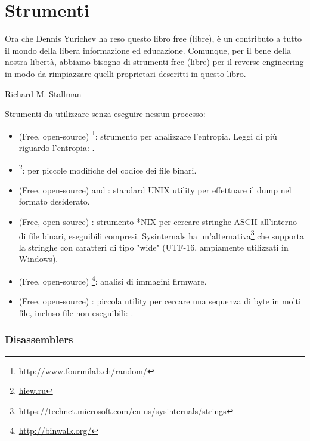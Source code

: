 \chapter{Strumenti}

\epigraph{Ora che Dennis Yurichev ha reso questo libro free (libre), è un
contributo a tutto il mondo della libera informazione ed educazione.
Comunque, per il bene della nostra libertà, abbiamo bisogno di strumenti free (libre) per il reverse
engineering in modo da rimpiazzare quelli proprietari descritti in questo libro.}{Richard M. Stallman}


Strumenti da utilizzare senza eseguire nessun processo:


\begin{itemize}
\item
(Free, open-source) \footnote{\url{http://www.fourmilab.ch/random/}}: strumento per analizzare l'entropia.
Leggi di più riguardo l'entropia: .

\item
\label{Hiew}
\footnote{\href{http://go.yurichev.com/17035}{hiew.ru}}:
per piccole modifiche del codice dei file binari.

\item (Free, open-source)  and : standard UNIX utility per effettuare il dump nel formato desiderato. 

\item (Free, open-source) : strumento *NIX per cercare stringhe ASCII all'interno di file binari, eseguibili compresi.
Sysinternals ha un'alternativa\footnote{\url{https://technet.microsoft.com/en-us/sysinternals/strings}}
che supporta la stringhe con caratteri di tipo "wide" (UTF-16, ampiamente utilizzati in Windows).

\item (Free, open-source) \footnote{\url{http://binwalk.org/}}: analisi di immagini firmware.

\item
{}
(Free, open-source) :
piccola utility per cercare una sequenza di byte in molti file,
incluso file non eseguibili: \BGREPURL.
\end{itemize}

\subsection{Disassemblers}

